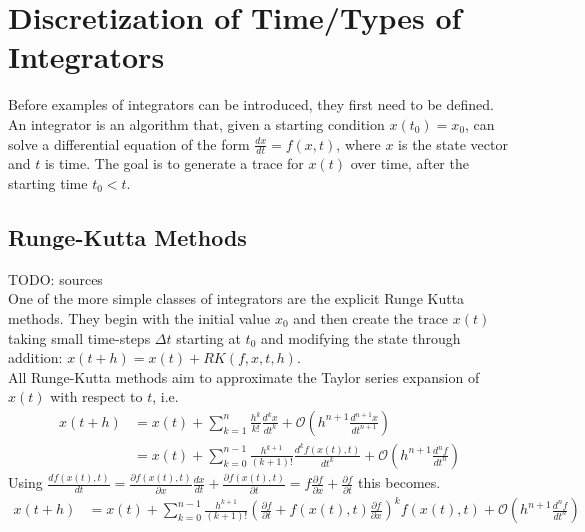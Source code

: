 \section{Discretization of Time/Types of Integrators}
Before examples of integrators can be introduced, they first need to be defined.
An integrator is an algorithm that, given a starting condition $x(t_0) = x_0$, can solve a differential equation of the form $\frac{dx}{dt} = f(x,t)$, where $x$ is the state vector and $t$ is time.
The goal is to generate a trace for $x(t)$ over time, after the starting time $t_0<t$.

\subsection{Runge-Kutta Methods}
TODO: sources\\
One of the more simple classes of integrators are the explicit Runge Kutta methods.
They begin with the initial value $x_0$ and then create the trace $x(t)$ taking small time-steps $\Delta t$ starting at $t_0$ and modifying the state through addition: $x(t+h) = x(t) + RK(f,x,t,h)$.\\
All Runge-Kutta methods aim to approximate the Taylor series expansion of $x(t)$ with respect to $t$, i.e.
\begin{align*}
x(t+h) &= x(t) + \sum_{k=1}^{n}\frac{h^k}{k!}\frac{d^kx}{dt^k} + \mathcal{O} \left(h^{n+1}\frac{d^{n+1}x}{dt^{n+1}}\right)\\
&= x(t)+ \sum_{k=0}^{n-1}\frac{h^{k+1}}{(k+1)!}\frac{d^kf(x(t),t)}{dt^k} + \mathcal{O}\left(h^{n+1}\frac{d^{n}f}{dt^{n}}\right)
\end{align*}
Using $\frac{df(x(t),t)}{dt} 
= \frac{\partial f(x(t),t)}{\partial x}\frac{dx}{dt}+\frac{\partial f(x(t),t)}{\partial t} 
= f\frac{\partial f}{\partial x}+\frac{\partial f}{\partial t}$
this becomes.
\begin{align*}
x(t+h) &= x(t)+ \sum_{k=0}^{n-1}\frac{h^{k+1}}{(k+1)!}\left(\frac{\partial f}{\partial t} + f(x(t),t)\frac{\partial f}{\partial x}\right)^kf(x(t),t) + \mathcal{O}\left(h^{n+1}\frac{d^{n}f}{dt^{n}}\right)
\end{align*}


